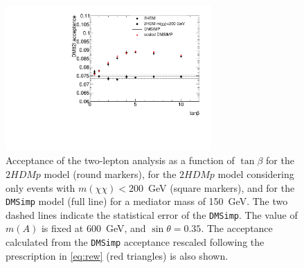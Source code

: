 \begin{figure}[htb]
\begin{center}
\includegraphics[width=0.7\textwidth]{texinputs/04_grid/figures/DMHF/plotacc_tb.pdf}
\caption{Acceptance of the two-lepton analysis as a function of $\tan\beta$ for the $2HDMp$ model (round markers), for the $2HDMp$ model considering only events with $m(\chi\chi)<200$~GeV (square markers), and for the \texttt{DMSimp} model (full line) for a mediator mass of 150~GeV. 
The two dashed lines indicate the statistical error of the \texttt{DMSimp}. The value of $m(A)$ is fixed at 600~GeV, and $\sin\theta=0.35$. 
The acceptance calculated from the \texttt{DMSimp} acceptance rescaled following the prescription in \autoref{eq:rew} (red triangles) is also shown.}
\label{fig:tbfin}
\end{center}
\end{figure}

